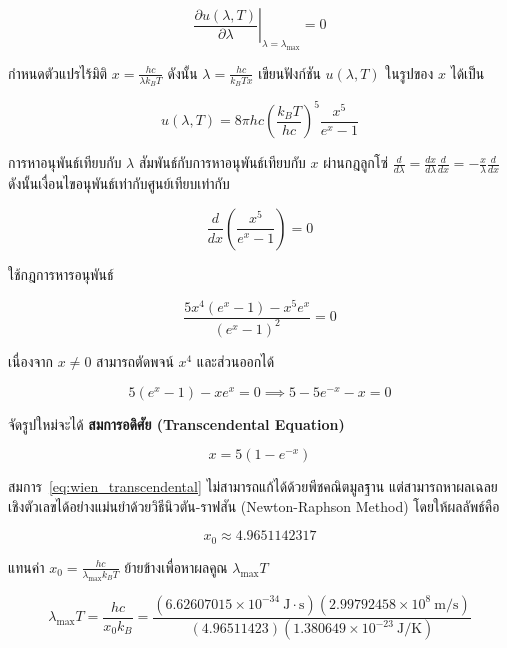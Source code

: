 \begin{equation}
\left. \frac{\partial u(\lambda, T)}{\partial \lambda} \right|_{\lambda = \lambda_{\max}} = 0
\label{eq:wien_extremum_condition}
\end{equation}

กำหนดตัวแปรไร้มิติ $x = \frac{hc}{\lambda k_B T}$ ดังนั้น $\lambda = \frac{hc}{k_B T x}$ เขียนฟังก์ชัน $u(\lambda, T)$ ในรูปของ $x$ ได้เป็น

\begin{equation}
u(\lambda, T) = 8\pi h c \left( \frac{k_B T}{hc} \right)^5 \frac{x^5}{e^x - 1}
\end{equation}

การหาอนุพันธ์เทียบกับ $\lambda$ สัมพันธ์กับการหาอนุพันธ์เทียบกับ $x$ ผ่านกฎลูกโซ่ $\frac{d}{d\lambda} = \frac{dx}{d\lambda}\frac{d}{dx} = -\frac{x}{\lambda}\frac{d}{dx}$ ดังนั้นเงื่อนไขอนุพันธ์เท่ากับศูนย์เทียบเท่ากับ

\begin{equation}
\frac{d}{dx}\left( \frac{x^5}{e^x - 1} \right) = 0
\end{equation}

ใช้กฎการหารอนุพันธ์

\begin{equation}
\frac{5x^4(e^x - 1) - x^5 e^x}{(e^x - 1)^2} = 0
\end{equation}

เนื่องจาก $x \neq 0$ สามารถตัดพจน์ $x^4$ และส่วนออกได้

\begin{equation}
5(e^x - 1) - x e^x = 0 \implies 5 - 5e^{-x} - x = 0
\end{equation}

จัดรูปใหม่จะได้ \textbf{สมการอดิศัย (Transcendental Equation)}

\begin{equation}
x = 5(1 - e^{-x})
\label{eq:wien_transcendental}
\end{equation}

สมการ~\eqref{eq:wien_transcendental} ไม่สามารถแก้ได้ด้วยพีชคณิตมูลฐาน แต่สามารถหาผลเฉลยเชิงตัวเลขได้อย่างแม่นยำด้วยวิธีนิวตัน-ราฟสัน (Newton-Raphson Method) โดยให้ผลลัพธ์คือ

\begin{equation}
x_0 \approx 4.9651142317
\label{eq:wien_root}
\end{equation}

แทนค่า $x_0 = \frac{hc}{\lambda_{\max} k_B T}$ ย้ายข้างเพื่อหาผลคูณ $\lambda_{\max} T$

\begin{equation}
\lambda_{\max} T = \frac{hc}{x_0 k_B} = \frac{(6.62607015 \times 10^{-34}~\text{J}\cdot\text{s})(2.99792458 \times 10^8~\text{m/s})}{(4.96511423)(1.380649 \times 10^{-23}~\text{J/K})}
\end{equation}

